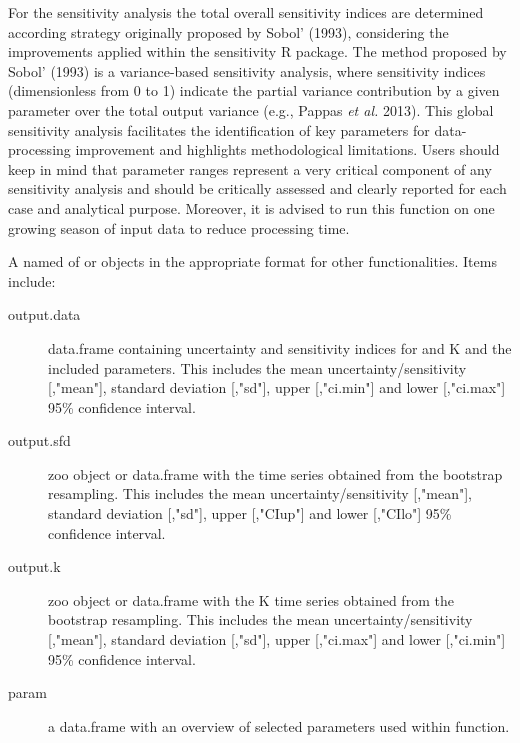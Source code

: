 \documentclass[a4paper]{book}
\begin{document}
\begin{Details}
For the sensitivity analysis the total overall sensitivity indices are determined according strategy originally proposed by
Sobol' (1993), considering the improvements applied within the sensitivity R package.
The method proposed by Sobol’ (1993) is a variance-based sensitivity analysis,
where sensitivity indices (dimensionless from 0 to 1) indicate the partial variance contribution
by a given parameter over the total output variance (e.g., Pappas \emph{et al.} 2013).
This global sensitivity analysis facilitates the identification of key parameters for data-processing
improvement and highlights methodological limitations. Users should keep in mind that parameter ranges represent
a very critical component of any sensitivity analysis and should be critically assessed and clearly reported
for each case and analytical purpose. Moreover, it is advised to run this function on one growing season of input data to reduce processing time.
\end{Details}
%
\begin{Value}
A named  of  or  objects in the appropriate format for other functionalities.
Items include:

\begin{description}


\item[output.data] data.frame containing uncertainty and sensitivity indices for  and K and the included parameters.
This includes the mean uncertainty/sensitivity [,"mean"], standard deviation [,"sd"], upper [,"ci.min"] and lower [,"ci.max"]
95\% confidence interval.

\item[output.sfd] zoo object or data.frame with the  time series obtained from the bootstrap resampling.
This includes the mean uncertainty/sensitivity [,"mean"], standard deviation [,"sd"], upper [,"CIup"] and lower [,"CIlo"]
95\% confidence interval.

\item[output.k] zoo object or data.frame with the K time series obtained from the bootstrap resampling.
This includes the mean uncertainty/sensitivity [,"mean"], standard deviation [,"sd"], upper [,"ci.max"]
and lower [,"ci.min"] 95\% confidence interval. 


\item[param] a data.frame with an overview of selected parameters used within  function. 



\end{description}

\end{Value}
\end{document}
